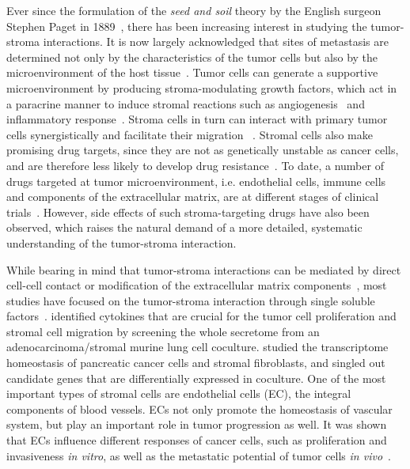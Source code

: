 Ever since the formulation of the \emph{seed and soil} theory by the English 
surgeon Stephen Paget in 1889~\citep{Paget1889}, there has been increasing 
interest in studying the tumor-stroma interactions. 
It is now largely acknowledged that sites of metastasis are determined 
not only by the characteristics of the tumor
cells but also by the microenvironment of
the host tissue~\citep{Fidler2003}. Tumor cells can generate a supportive
microenvironment by producing stroma-modulating
growth factors, which act in a
paracrine manner to induce stromal reactions such as
angiogenesis~\citep{Bergers2003}
and inflammatory response~\citep{Coussens2002}. Stroma cells in turn can
interact with primary tumor cells synergistically and facilitate their migration~%
\citep{Wyckoff2004}.
Stromal cells also make promising drug targets, since they are not as 
genetically
unstable as cancer cells, and are therefore less likely to
develop drug resistance~\citep{Kerbel1997}. To date, a number of drugs targeted
at tumor microenvironment, i.e. endothelial cells, immune cells and components
of the extracellular matrix, are at different stages of clinical 
trials~\citep{Mueller2004}. However, side effects of such stroma-targeting drugs
have also been observed, which raises the natural demand of a more detailed, 
systematic understanding of the tumor-stroma interaction.

While bearing in mind that tumor-stroma interactions can be mediated by direct cell-cell contact or modification of the extracellular matrix
components~\citep{Micke2004a}, most studies have focused on the tumor-stroma interaction through
single soluble factors~\citep{Kryczek2007,Saijo2002i,Nakamura1997}. 
\cite{Zhong2008} identified cytokines that are crucial for the 
tumor cell proliferation
and stromal cell migration by screening the whole secretome from
an adenocarcinoma/stromal murine lung cell coculture.
\cite{Sato2004} studied
the transcriptome homeostasis of pancreatic
cancer cells and stromal fibroblasts,
and singled out candidate genes that are
differentially expressed in coculture.
One of the most important types of stromal cells are endothelial cells (EC), 
the integral components of blood vessels. ECs not only promote the homeostasis of 
vascular system, but play an important role in tumor progression as well. 
It was shown that ECs influence different responses of cancer cells, such as 
proliferation and invasiveness \emph{in vitro}, as well as the metastatic potential 
of tumor cells \emph{in vivo}~\citep{Franses2011}.

